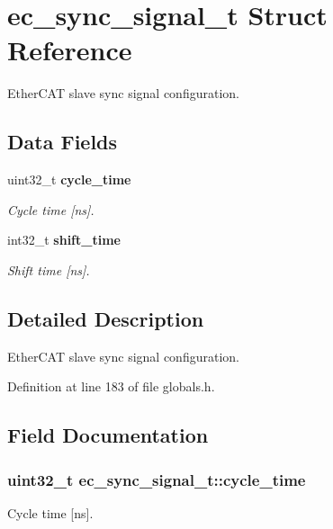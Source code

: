 \section{ec\-\_\-sync\-\_\-signal\-\_\-t Struct Reference}
\label{structec__sync__signal__t}


Ether\-C\-A\-T slave sync signal configuration.  


\subsection*{Data Fields}
\begin{DoxyCompactItemize}
\item 
uint32\-\_\-t {\bf cycle\-\_\-time}
\begin{DoxyCompactList}\small\item\em Cycle time [ns]. \end{DoxyCompactList}\item 
int32\-\_\-t {\bf shift\-\_\-time}
\begin{DoxyCompactList}\small\item\em Shift time [ns]. \end{DoxyCompactList}\end{DoxyCompactItemize}


\subsection{Detailed Description}
Ether\-C\-A\-T slave sync signal configuration. 

Definition at line 183 of file globals.\-h.



\subsection{Field Documentation}
\subsubsection[{cycle\-\_\-time}]{\setlength{\rightskip}{0pt plus 5cm}uint32\-\_\-t ec\-\_\-sync\-\_\-signal\-\_\-t\-::cycle\-\_\-time}\label{structec__sync__signal__t_a584e9c4963c35777cfc06838793e20e0}


Cycle time [ns]. 



